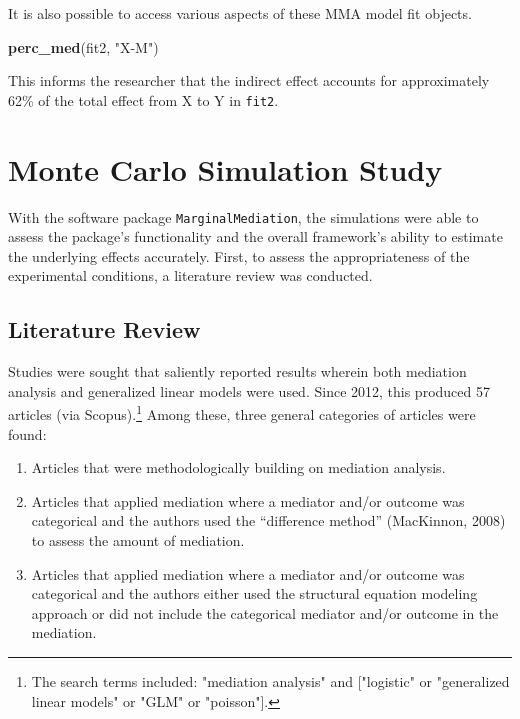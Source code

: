 \documentclass[]{DissertateUSU}
\newenvironment{Shaded}{\begin{snugshade}}{\end{snugshade}}
\newcommand{\KeywordTok}[1]{\textcolor[rgb]{0.13,0.29,0.53}{\textbf{#1}}}
\newcommand{\StringTok}[1]{\textcolor[rgb]{0.31,0.60,0.02}{#1}}
\newcommand{\NormalTok}[1]{#1}
\providecommand{\tightlist}{%
  \setlength{\itemsep}{0pt}\setlength{\parskip}{0pt}}
\let\rmarkdownfootnote\footnote%
\def\footnote{\protect\rmarkdownfootnote}
\begin{document}
\doublespacing

It is also possible to access various aspects of these MMA model fit
objects.

\begin{Shaded}
\begin{Highlighting}[]
\KeywordTok{perc_med}\NormalTok{(fit2, }\StringTok{"X-M"}\NormalTok{)}
\end{Highlighting}
\end{Shaded}

\noindent This informs the researcher that the indirect effect accounts
for approximately 62\% of the total effect from X to Y in \texttt{fit2}.

\section{Monte Carlo Simulation
Study}\label{monte-carlo-simulation-study}

With the software package \texttt{MarginalMediation}, the simulations
were able to assess the package's functionality and the overall
framework's ability to estimate the underlying effects accurately.
First, to assess the appropriateness of the experimental conditions, a
literature review was conducted.

\subsection{Literature Review}\label{literature-review-1}

Studies were sought that saliently reported results wherein both
mediation analysis and generalized linear models were used. Since 2012,
this produced 57 articles (via
Scopus).\footnote{The search terms included: "mediation analysis" and ["logistic" or "generalized linear models" or "GLM" or "poisson"].}
Among these, three general categories of articles were found:

\begin{enumerate}
\def\labelenumi{\arabic{enumi}.}
\tightlist
\item
  Articles that were methodologically building on mediation analysis.
\item
  Articles that applied mediation where a mediator and/or outcome was
  categorical and the authors used the ``difference method'' (MacKinnon,
  2008) to assess the amount of mediation.
\item
  Articles that applied mediation where a mediator and/or outcome was
  categorical and the authors either used the structural equation
  modeling approach or did not include the categorical mediator and/or
  outcome in the mediation.
\end{enumerate}
\end{document}
